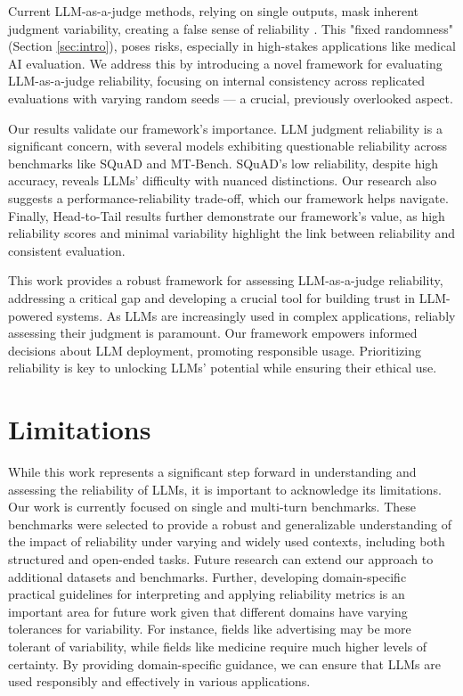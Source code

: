 \documentclass[11pt]{article}
\begin{document}
Current LLM-as-a-judge methods, relying on single outputs, mask inherent judgment variability, creating a false sense of reliability \citep{ouyang2023llm, wei2024systematic}. This "fixed randomness" (Section \ref{sec:intro}), poses risks, especially in high-stakes applications like medical AI evaluation. We address this by introducing a novel framework for evaluating LLM-as-a-judge reliability, focusing on internal consistency across replicated evaluations with varying random seeds — a crucial, previously overlooked aspect. 

Our results validate our framework's importance. LLM judgment reliability is a significant concern, with several models exhibiting questionable reliability across benchmarks like SQuAD and MT-Bench. SQuAD's low reliability, despite high accuracy, reveals LLMs' difficulty with nuanced distinctions. Our research also suggests a performance-reliability trade-off, which our framework helps navigate. Finally, Head-to-Tail results further demonstrate our framework's value, as high reliability scores and minimal variability highlight the link between reliability and consistent evaluation.

This work provides a robust framework for assessing LLM-as-a-judge reliability, addressing a critical gap and developing a crucial tool for building trust in LLM-powered systems. As LLMs are increasingly used in complex applications, reliably assessing their judgment is paramount. Our framework empowers informed decisions about LLM deployment, promoting responsible usage. Prioritizing reliability is key to unlocking LLMs' potential while ensuring their ethical use.


\section{Limitations}

While this work represents a significant step forward in understanding and assessing the reliability of LLMs, it is important to acknowledge its limitations. Our work is currently focused on single and multi-turn benchmarks. These benchmarks were selected to provide a robust and generalizable understanding of the impact of reliability under varying and widely used contexts, including both structured and open-ended tasks. Future research can extend our approach to additional datasets and benchmarks. Further, developing domain-specific practical guidelines for interpreting and applying reliability metrics is an important area for future work given that different domains have varying tolerances for variability. For instance, fields like advertising may be more tolerant of variability, while fields like medicine require much higher levels of certainty. By providing domain-specific guidance, we can ensure that LLMs are used responsibly and effectively in various applications.
\end{document}
